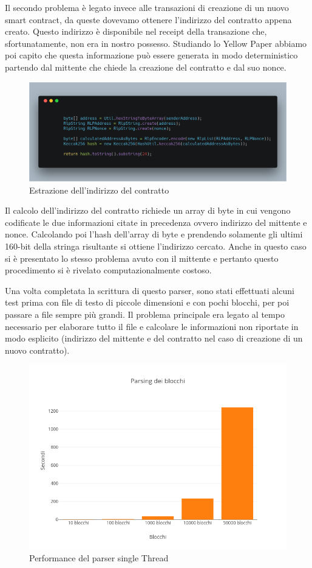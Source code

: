 \documentclass[12pt]{report}
\begin{document}
Il secondo problema è legato invece alle transazioni di creazione di un nuovo smart contract, da queste dovevamo ottenere l'indirizzo del contratto appena creato. Questo indirizzo è disponibile nel receipt della transazione che, sfortunatamente, non era in nostro possesso.
Studiando lo Yellow Paper abbiamo poi capito che questa informazione può essere generata in modo deterministico partendo dal mittente che chiede la creazione del contratto e dal suo nonce.
\begin{figure}[H]
    \includegraphics[width=\textwidth]{carbon-17}
    \caption{Estrazione dell'indirizzo del contratto}
\end{figure}

Il calcolo dell'indirizzo del contratto richiede un array di byte in cui vengono codificate le due informazioni citate in precedenza ovvero indirizzo del mittente e nonce.
Calcolando poi l'hash dell'array di byte e prendendo solamente gli ultimi 160-bit della stringa risultante si ottiene l'indirizzo cercato.
Anche in questo caso si è presentato lo stesso problema avuto con il mittente e pertanto questo procedimento si è rivelato computazionalmente costoso.

Una volta completata la scrittura di questo parser, sono stati effettuati alcuni test prima con file di testo di piccole dimensioni e con pochi blocchi, per poi passare a file sempre più grandi.
Il problema principale era legato al tempo necessario per elaborare tutto il file e calcolare le informazioni non riportate in modo esplicito (indirizzo del mittente e del contratto nel caso di creazione di un nuovo contratto).

\begin{figure}[H]
    \includegraphics[width=\textwidth]{Plot1.png}
    \caption{Performance del parser single Thread}
\end{figure}
\end{document}
